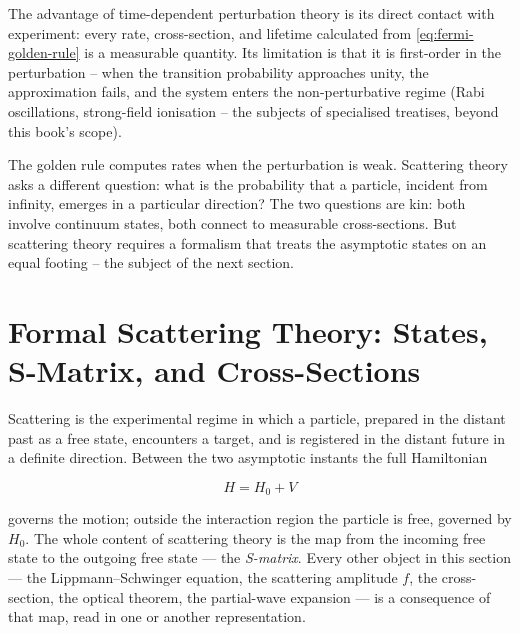 The advantage of time-dependent perturbation theory is its direct contact with experiment: every rate, cross-section, and lifetime calculated from \eqref{eq:fermi-golden-rule} is a measurable quantity. Its limitation is that it is first-order in the perturbation -- when the transition probability approaches unity, the approximation fails, and the system enters the non-perturbative regime (Rabi oscillations, strong-field ionisation -- the subjects of specialised treatises, beyond this book's scope).

The golden rule computes rates when the perturbation is weak. Scattering theory asks a different question: what is the probability that a particle, incident from infinity, emerges in a particular direction? The two questions are kin: both involve continuum states, both connect to measurable cross-sections. But scattering theory requires a formalism that treats the asymptotic states on an equal footing -- the subject of the next section.

\section{Formal Scattering Theory: States, S-Matrix, and Cross-Sections}
\label{sec:scattering-formalism}

Scattering is the experimental regime in which a particle, prepared in the distant past as a free state, encounters a target, and is registered in the distant future in a definite direction. Between the two asymptotic instants the full Hamiltonian
\begin{linenomath}
\begin{equation*}
H = H_{0} + V
\end{equation*}
\end{linenomath}
governs the motion; outside the interaction region the particle is free, governed by $H_{0}$. The whole content of scattering theory is the map from the incoming free state to the outgoing free state --- the \emph{S-matrix}. Every other object in this section --- the Lippmann--Schwinger equation, the scattering amplitude $f$, the cross-section, the optical theorem, the partial-wave expansion --- is a consequence of that map, read in one or another representation.

